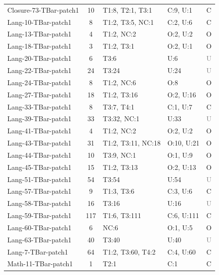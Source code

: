 \begin{table}[t]
\begin{tabular}{l|c|l|l|c}
Closure-73-TBar-patch1 & 10 & T1:8, T2:1, T3:1 & C:9, U:1 & \textcolor{green!60!black}{C} \\
Lang-10-TBar-patch1 & 8 & T1:2, T3:5, NC:1 & C:2, U:6 & \textcolor{green!60!black}{C} \\
Lang-13-TBar-patch1 & 4 & T1:2, NC:2 & O:2, U:2 & \textcolor{green!60!black}{O} \\
Lang-18-TBar-patch1 & 3 & T1:2, T3:1 & O:2, U:1 & \textcolor{green!60!black}{O} \\
Lang-20-TBar-patch1 & 6 & T3:6 & U:6 & \textcolor{gray}{U} \\
Lang-22-TBar-patch1 & 24 & T3:24 & U:24 & \textcolor{gray}{U} \\
Lang-24-TBar-patch1 & 8 & T1:2, NC:6 & O:8 & \textcolor{green!60!black}{O} \\
Lang-27-TBar-patch1 & 18 & T1:2, T3:16 & O:2, U:16 & \textcolor{green!60!black}{O} \\
Lang-33-TBar-patch1 & 8 & T3:7, T4:1 & C:1, U:7 & \textcolor{green!60!black}{C} \\
Lang-39-TBar-patch1 & 33 & T3:32, NC:1 & U:33 & \textcolor{gray}{U} \\
Lang-41-TBar-patch1 & 4 & T1:2, NC:2 & O:2, U:2 & \textcolor{green!60!black}{O} \\
Lang-43-TBar-patch1 & 31 & T1:2, T3:11, NC:18 & O:10, U:21 & \textcolor{green!60!black}{O} \\
Lang-44-TBar-patch1 & 10 & T3:9, NC:1 & O:1, U:9 & \textcolor{green!60!black}{O} \\
Lang-45-TBar-patch1 & 15 & T1:2, T3:13 & O:2, U:13 & \textcolor{green!60!black}{O} \\
Lang-51-TBar-patch1 & 54 & T3:54 & U:54 & \textcolor{gray}{U} \\
Lang-57-TBar-patch1 & 9 & T1:3, T3:6 & C:3, U:6 & \textcolor{green!60!black}{C} \\
Lang-58-TBar-patch1 & 16 & T3:16 & U:16 & \textcolor{gray}{U} \\
Lang-59-TBar-patch1 & 117 & T1:6, T3:111 & C:6, U:111 & \textcolor{green!60!black}{C} \\
Lang-60-TBar-patch1 & 6 & NC:6 & O:1, U:5 & \textcolor{green!60!black}{O} \\
Lang-63-TBar-patch1 & 40 & T3:40 & U:40 & \textcolor{gray}{U} \\
Lang-7-TBar-patch1 & 64 & T1:2, T3:60, T4:2 & C:4, U:60 & \textcolor{green!60!black}{C} \\
Math-11-TBar-patch1 & 1 & T2:1 & C:1 & \textcolor{green!60!black}{C} \\

\end{tabular}
\end{table}
